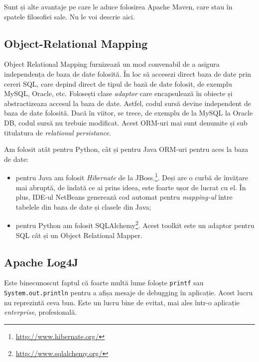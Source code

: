 Sunt și alte avantaje pe care le aduce folosirea Apache Maven, care stau în spatele filosofiei sale. Nu le voi descrie aici.

\subsection{Object-Relational Mapping}



Object Relational Mapping furnizează un mod convenabil de a asigura independența de baza de date folosită. În loc să accesezi direct baza de date prin cereri SQL, care depind direct de tipul de bază de date folosit, de exemplu MySQL, Oracle, etc. Folosești clase \textit{adaptor} care encapsulează în obiecte și abstractizeaza accesul la baza de date. Astfel, codul sursă devine independent de baza de date folosită. Dacă în viitor, se trece, de exemplu de la MySQL la Oracle DB, codul sursă nu trebuie modificat. Acest ORM-uri mai sunt denumite și sub titulatura de \textit{relational persistance}.

Am folosit atât pentru Python, cât și pentru Java ORM-uri pentru aces la baza de date:
\begin{itemize}
\item pentru Java am folosit \textit{Hibernate} de la JBoss.\footnote{\url{http://www.hibernate.org/}}. Deși are o curbă de învățare mai abruptă, de îndată ce ai prins ideea, este foarte ușor de lucrat cu el. În plus, IDE-ul NetBeans generează cod automat pentru \textit{mapping-ul} între tabelele din baza de date și clasele din Java;

\item pentru Python am folosit SQLAlchemy\footnote{\url{http://www.sqlalchemy.org/}}. Acest toolkit este un adaptor pentru SQL cât și un Object Relational Mapper.

\end{itemize}


\subsection{Apache Log4J}

Este binecunoscut faptul că foarte multă lume foloște \texttt{printf} sau \texttt{System.out.println} pentru a afișa mesaje de debugging în aplicație. Acest lucru nu reprezintă ceva bun. Este un lucru bine de evitat, mai ales într-o aplicație \textit{enterprise}, profesională.

